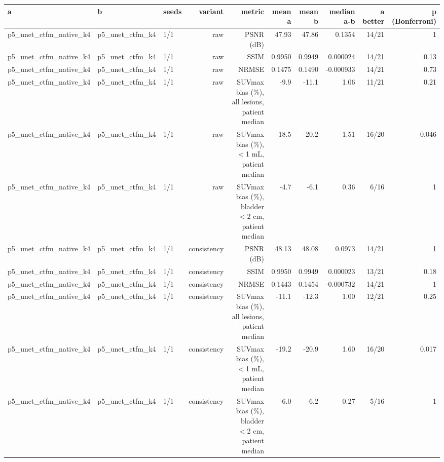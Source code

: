 \begin{tabular}{lllrrrrrrr}
\toprule
a & b & seeds & variant & metric & mean a & mean b & median a-b & a better & p (Bonferroni) \\
\midrule
p5\_unet\_ctfm\_native\_k4 & p5\_unet\_ctfm\_k4 & 1/1 & raw & PSNR (dB) & 47.93 & 47.86 & 0.1354 & 14/21 & 1 \\
p5\_unet\_ctfm\_native\_k4 & p5\_unet\_ctfm\_k4 & 1/1 & raw & SSIM & 0.9950 & 0.9949 & 0.000024 & 14/21 & 0.13 \\
p5\_unet\_ctfm\_native\_k4 & p5\_unet\_ctfm\_k4 & 1/1 & raw & NRMSE & 0.1475 & 0.1490 & -0.000933 & 14/21 & 0.73 \\
p5\_unet\_ctfm\_native\_k4 & p5\_unet\_ctfm\_k4 & 1/1 & raw & SUVmax bias (\%), all lesions, patient median & -9.9 & -11.1 & 1.06 & 11/21 & 0.21 \\
p5\_unet\_ctfm\_native\_k4 & p5\_unet\_ctfm\_k4 & 1/1 & raw & SUVmax bias (\%), $<$1 mL, patient median & -18.5 & -20.2 & 1.51 & 16/20 & 0.046 \\
p5\_unet\_ctfm\_native\_k4 & p5\_unet\_ctfm\_k4 & 1/1 & raw & SUVmax bias (\%), bladder $<$2 cm, patient median & -4.7 & -6.1 & 0.36 & 6/16 & 1 \\
p5\_unet\_ctfm\_native\_k4 & p5\_unet\_ctfm\_k4 & 1/1 & consistency & PSNR (dB) & 48.13 & 48.08 & 0.0973 & 14/21 & 1 \\
p5\_unet\_ctfm\_native\_k4 & p5\_unet\_ctfm\_k4 & 1/1 & consistency & SSIM & 0.9950 & 0.9949 & 0.000023 & 13/21 & 0.18 \\
p5\_unet\_ctfm\_native\_k4 & p5\_unet\_ctfm\_k4 & 1/1 & consistency & NRMSE & 0.1443 & 0.1454 & -0.000732 & 14/21 & 1 \\
p5\_unet\_ctfm\_native\_k4 & p5\_unet\_ctfm\_k4 & 1/1 & consistency & SUVmax bias (\%), all lesions, patient median & -11.1 & -12.3 & 1.00 & 12/21 & 0.25 \\
p5\_unet\_ctfm\_native\_k4 & p5\_unet\_ctfm\_k4 & 1/1 & consistency & SUVmax bias (\%), $<$1 mL, patient median & -19.2 & -20.9 & 1.60 & 16/20 & 0.017 \\
p5\_unet\_ctfm\_native\_k4 & p5\_unet\_ctfm\_k4 & 1/1 & consistency & SUVmax bias (\%), bladder $<$2 cm, patient median & -6.0 & -6.2 & 0.27 & 5/16 & 1 \\
\bottomrule
\end{tabular}
